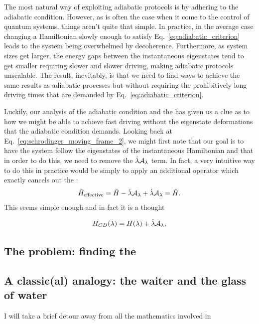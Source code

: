     The most natural way of exploiting adiabatic protocols is by adhering to the adiabatic condition. However, as is often the case when it come to the control of quantum systems, things aren't quite that simple. In practice, in the average case changing a Hamiltonian slowly enough to satisfy Eq.~\eqref{eq:adiabatic_criterion} leads to the system being overwhelmed by decoherence. Furthermore, as system sizes get larger, the energy gaps between the instantaneous eigenstates tend to get smaller requiring slower and slower driving, making adiabatic protocols unscalable. The result, inevitably, is that we need to find ways to achieve the same results as adiabatic processes but without requiring the prohibitively long driving times that are demanded by Eq.~\eqref{eq:adiabatic_criterion}.
    
    Luckily, our analysis of the adiabatic condition and the  has given us a clue as to how we might be able to achieve fast driving without the eigenstate deformations that the adiabatic condition demands. Looking back at Eq.~\eqref{eq:schrodinger_moving_frame_2}, we might first note that our goal is to have the system follow the eigenstates of the instantaneous Hamiltonian and that in order to do this, we need to remove the $\dot{\lambda} \mathcal{A}_{\lambda}$ term. In fact, a very intuitive way to do this in practice would be simply to apply an additional operator which exactly cancels out the :
    \begin{equation}
    	\Tilde{H}_{\rm effective} = \Tilde{H} - \dot{\lambda} \mathcal{A}_{\lambda} + \dot{\lambda} \mathcal{A}_{\lambda} = \Tilde{H}.
    \end{equation}
    This seems simple enough and in fact it is a thought 

    \begin{equation}\label{eq:CD_Hamiltonian}
    H_{CD}(\lambda) = H(\lambda) + \dot{\lambda} \mathcal{A}_\lambda,
    \end{equation}

    \subsection{The problem: finding the }

    \subsection{A classic(al) analogy: the waiter and the glass of water}

    I will take a brief detour away from all the mathematics involved in 
    
